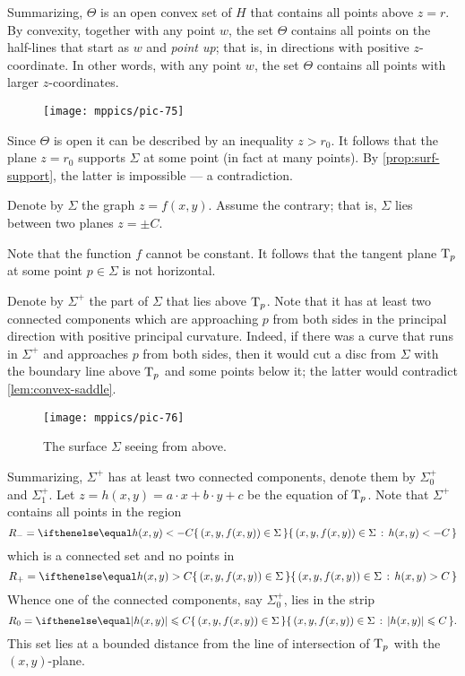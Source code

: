 Summarizing, $\Theta$ is an open convex set of $H$ that contains all points above $z=r$.
By convexity, together with any point $w$, the set $\Theta$ contains all points on the half-lines that start as $w$ and \textit{point up}; that is, in directions with positive $z$-coordinate. 
In other words, with any point $w$,
the set $\Theta$ contains all points with larger $z$-coordinates.
\begin{figure}[!ht]
\vskip-0mm
\centering
\texttt{[image: mppics/pic-75]}
\vskip0mm
\end{figure}
Since $\Theta$ is open it can be described by an inequality $z>r_0$.
It follows that the plane $z=r_0$ supports $\Sigma$ at some point (in fact at many points).
By \ref{prop:surf-support}, the latter is impossible --- a contradiction.
\qeds

Denote by $\Sigma$ the graph $z=f(x,y)$.
Assume the contrary; that is, $\Sigma$ lies between two planes $z=\pm C$.

Note that the function $f$ cannot be constant.
It follows that the tangent plane $\mathrm{T}_p$ at some point $p\in\Sigma$ is not horizontal.

Denote by $\Sigma^+$ the part of $\Sigma$ that lies above $\mathrm{T}_p$.
Note that it has at least two connected components which are approaching $p$ from both sides 
in the principal direction with positive principal curvature.
Indeed, if there was a curve that runs in $\Sigma^+$ and approaches $p$ from both sides, then it would cut a disc from $\Sigma$ with the boundary line above $\mathrm{T}_p$ and some points below it;
the latter would contradict \ref{lem:convex-saddle}.

\begin{figure}[!ht]
\vskip-0mm
\centering
\texttt{[image: mppics/pic-76]}
\caption*{The surface $\Sigma$ seeing from above.}
\vskip0mm
\end{figure}

Summarizing, $\Sigma^+$ has at least two connected components, denote them by $\Sigma^+_0$ and $\Sigma^+_1$.
Let $z=h(x,y)=a\cdot x+b\cdot y+c$ be the equation of $\mathrm{T}_p$.
Note that $\Sigma^+$ contains all points in the region
\[R_-=\set{(x,y,f(x,y))\in\Sigma}{h(x,y)< -C}\] 
which is a connected set and no points in 
\[R_+=\set{(x,y,f(x,y))\in\Sigma}{h(x,y)> C}\]
Whence one of the connected components, say $\Sigma^+_0$, lies in the strip
\[R_0=\set{(x,y,f(x,y))\in\Sigma}{|h(x,y)|\le  C}.\]
This set lies at a bounded distance from the line of intersection of $\mathrm{T}_p$ with the $(x,y)$-plane.

